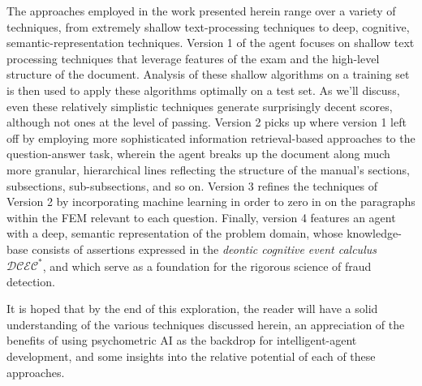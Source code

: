The approaches employed in the work presented herein range over a variety of techniques, from 
extremely shallow text-processing techniques to deep, cognitive, semantic-representation
techniques.  Version 1 of the agent focuses on shallow text processing techniques that leverage features of the 
exam and the high-level structure of the document.  Analysis of these shallow algorithms 
on a training set is then used to apply these algorithms optimally on a test set.  As we'll discuss, even these relatively simplistic techniques generate surprisingly decent scores, although not ones at the level of passing.  Version 2 picks up where version 1 left off by employing more sophisticated information
retrieval-based approaches to the question-answer task, wherein the agent breaks up 
the document along much more granular, hierarchical lines reflecting the structure of 
the manual's sections, subsections, sub-subsections, and so on.  Version 3 refines the techniques of Version 2 by incorporating machine learning in order to zero in on the paragraphs within the FEM relevant to each question.
Finally, version 4 features an agent with a deep, semantic representation of the problem
domain, whose knowledge-base consists of assertions expressed in the \textit{deontic
cognitive event calculus} $\mathcal{DCEC}^\ast$, and which serve as a foundation for the rigorous science of
fraud detection.

It is hoped that by the end of this exploration, the reader will have a solid understanding
of the various techniques discussed herein, an appreciation of the benefits of using psychometric AI
as the backdrop for intelligent-agent development, and some insights into the relative potential of each of these approaches.